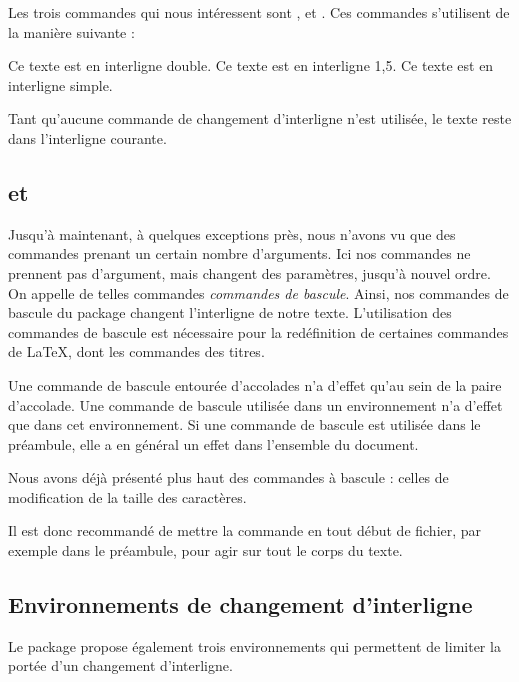 Les trois commandes qui nous intéressent sont ,  et . Ces commandes s'utilisent de la manière suivante :

\begin{latexcode}
\doublespacing
Ce texte est en interligne double.
\onehalfspacing
Ce texte est en interligne 1,5.
\singlespacing
Ce texte est en interligne simple. 
\end{latexcode}

Tant qu'aucune commande de changement d'interligne n'est utilisée, le texte reste dans l'interligne courante. 

\subsection{ et }\label{bascule}

Jusqu'à maintenant, à quelques exceptions près, nous n'avons vu que des commandes prenant un certain nombre d'arguments. Ici nos commandes ne prennent pas d'argument, mais changent des paramètres, jusqu'à nouvel ordre. On appelle de telles commandes \emph{commandes de bascule}. Ainsi, nos commandes de bascule du package  changent l'interligne de notre texte. L'utilisation des commandes de bascule est nécessaire pour la redéfinition de certaines commandes de \LaTeX, dont les commandes des titres.

Une commande de bascule entourée d'accolades n'a d'effet qu'au sein de la paire d'accolade. Une commande de bascule utilisée dans un environnement n'a d'effet que dans cet environnement. Si une commande de bascule est utilisée dans le préambule, elle a en général un effet dans l'ensemble du document.\label{porteebascule} 

Nous avons déjà présenté plus haut des commandes à bascule : celles de modification de la taille des caractères.

Il est donc recommandé de mettre la commande  en tout début de fichier, par exemple dans le préambule, pour agir sur tout le corps du texte.

\subsection{Environnements de changement d'interligne}

Le package  propose également trois environnements qui permettent de limiter la portée d'un changement d'interligne. 

